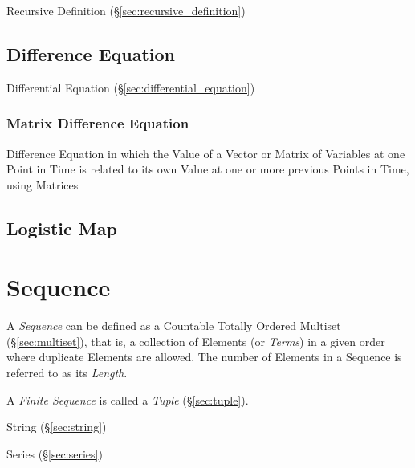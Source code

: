 Recursive Definition (\S\ref{sec:recursive_definition})



\subsection{Difference Equation}\label{sec:difference_equation}

\fist Differential Equation (\S\ref{sec:differential_equation})



\subsubsection{Matrix Difference Equation}\label{sec:matrix_difference_equation}

Difference Equation in which the Value of a Vector or Matrix of Variables at
one Point in Time is related to its own Value at one or more previous Points in
Time, using Matrices



\subsection{Logistic Map}\label{sec:logistic_map}



\section{Sequence}\label{sec:sequence}

A \emph{Sequence} can be defined as a Countable Totally Ordered
Multiset (\S\ref{sec:multiset}), that is, a collection of Elements (or
\emph{Terms}) in a given order where duplicate Elements are allowed.
The number of Elements in a Sequence is referred to as its
\emph{Length}.

A \emph{Finite Sequence} is called a \emph{Tuple} (\S\ref{sec:tuple}).

String (\S\ref{sec:string})

Series (\S\ref{sec:series})

